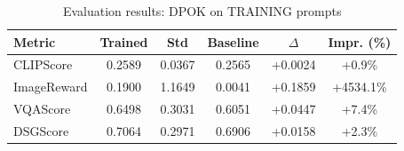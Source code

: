 \begin{table}[h]
\centering
\caption{Evaluation results: DPOK on TRAINING prompts}
\label{tab:eval}
\begin{tabular}{lccccc}
\toprule
Metric & Trained & Std & Baseline & $\Delta$ & Impr. (\%) \\
\midrule
CLIPScore & 0.2589 & 0.0367 & 0.2565 & +0.0024 & +0.9\% \\
ImageReward & 0.1900 & 1.1649 & 0.0041 & +0.1859 & +4534.1\% \\
VQAScore & 0.6498 & 0.3031 & 0.6051 & +0.0447 & +7.4\% \\
DSGScore & 0.7064 & 0.2971 & 0.6906 & +0.0158 & +2.3\% \\
\bottomrule
\end{tabular}
\end{table}